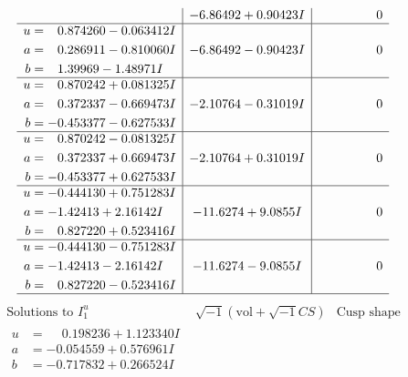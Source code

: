 \documentclass[1p]{elsarticle_modified}
\theoremstyle{definition}
\newcommand{\I}{\sqrt{-1}}
\begin{document}
$$\begin{array}{c|c|c}
 & -6.86492 + 0.90423 I & \phantom{-0.000000 } 0 \\ \hline\begin{aligned}
u &= \phantom{-}0.874260 - 0.063412 I \\
a &= \phantom{-}0.286911 - 0.810060 I \\
b &= \phantom{-}1.39969 - 1.48971 I\end{aligned}
 & -6.86492 - 0.90423 I & \phantom{-0.000000 } 0 \\ \hline\begin{aligned}
u &= \phantom{-}0.870242 + 0.081325 I \\
a &= \phantom{-}0.372337 - 0.669473 I \\
b &= -0.453377 - 0.627533 I\end{aligned}
 & -2.10764 - 0.31019 I & \phantom{-0.000000 } 0 \\ \hline\begin{aligned}
u &= \phantom{-}0.870242 - 0.081325 I \\
a &= \phantom{-}0.372337 + 0.669473 I \\
b &= -0.453377 + 0.627533 I\end{aligned}
 & -2.10764 + 0.31019 I & \phantom{-0.000000 } 0 \\ \hline\begin{aligned}
u &= -0.444130 + 0.751283 I \\
a &= -1.42413 + 2.16142 I \\
b &= \phantom{-}0.827220 + 0.523416 I\end{aligned}
 & -11.6274 + 9.0855 I & \phantom{-0.000000 } 0 \\ \hline\begin{aligned}
u &= -0.444130 - 0.751283 I \\
a &= -1.42413 - 2.16142 I \\
b &= \phantom{-}0.827220 - 0.523416 I\end{aligned}
 & -11.6274 - 9.0855 I & \phantom{-0.000000 } 0\\
 \hline 
 \end{array}$$\newpage$$\begin{array}{c|c|c}  
\text{Solutions to }I^u_{1}& \I (\text{vol} + \sqrt{-1}CS) & \text{Cusp shape}\\
 \hline 
\begin{aligned}
u &= \phantom{-}0.198236 + 1.123340 I \\
a &= -0.054559 + 0.576961 I \\
b &= -0.717832 + 0.266524 I\end{aligned}

\end{array}$$
\end{document}
